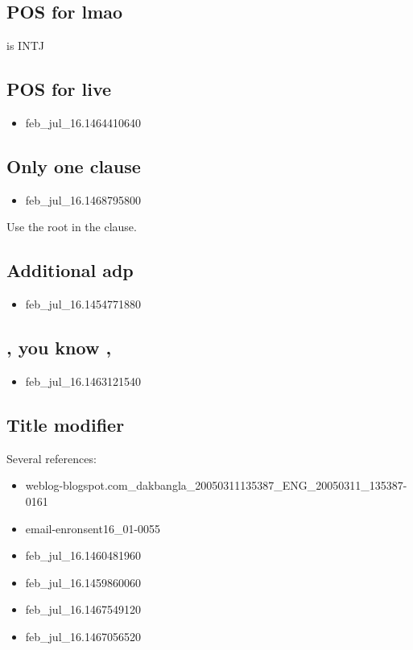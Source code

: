 \documentclass[11pt,a4paper]{article}
\begin{document}
\subsection{POS for lmao}
is \textsc{INTJ}

\subsection{POS for live}
\begin{itemize}
	\item feb\_jul\_16.1464410640
\end{itemize}

\subsection{Only one clause}
\begin{itemize}
	\item feb\_jul\_16.1468795800
\end{itemize}
Use the root in the clause.

\subsection{Additional adp}
\begin{itemize}
	\item feb\_jul\_16.1454771880
\end{itemize}

\subsection{, you know ,}
\begin{itemize}
	\item feb\_jul\_16.1463121540
\end{itemize}

\subsection{Title modifier}
Several references:
\begin{itemize}
	\item weblog-blogspot.com\_dakbangla\_20050311135387\_ENG\_20050311\_135387-0161
	\item email-enronsent16\_01-0055
\end{itemize}
\begin{itemize}
	\item feb\_jul\_16.1460481960
	\item feb\_jul\_16.1459860060
	\item feb\_jul\_16.1467549120
	\item feb\_jul\_16.1467056520
\end{itemize}
\end{document}
